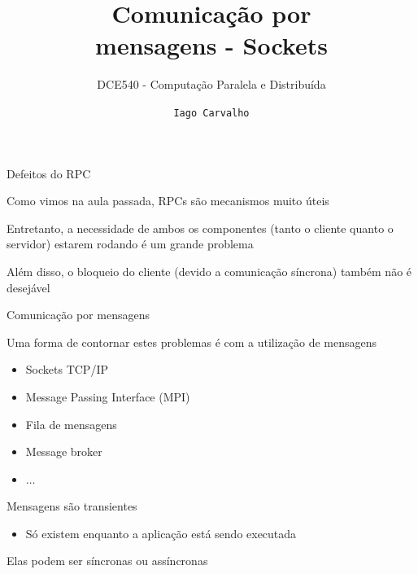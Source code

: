 \documentclass[compress]{beamer}
\title{Comunicação por \\ mensagens - Sockets}
\subtitle{DCE540 - Computação Paralela e Distribuída}
\author{\texttt{Iago Carvalho}}
\institute{\texttt{Departamento de Ciência da Computação}}
\begin{document}
\begin{frame}
\titlepage

\end{frame}


\begin{frame}{Defeitos do RPC}

Como vimos na aula passada, RPCs são mecanismos muito úteis

\vspace{1cm}

Entretanto, a necessidade de ambos os componentes (tanto o cliente quanto o servidor) estarem rodando é um grande problema

\vspace{1cm}

Além disso, o bloqueio do cliente (devido a comunicação síncrona) também não é desejável

\end{frame}



\begin{frame}{Comunicação por mensagens}

Uma forma de contornar estes problemas é com a utilização de mensagens
\begin{itemize}
    \item Sockets TCP/IP
    \item Message Passing Interface (MPI)
    \item Fila de mensagens
    \item Message broker
    \item $\ldots$
\end{itemize}

\vspace{0.3cm}

Mensagens são transientes
\begin{itemize}
    \item Só existem enquanto a aplicação está sendo executada
\end{itemize}

\vspace{0.3cm}

Elas podem ser síncronas ou assíncronas
\end{frame}

\end{document}
